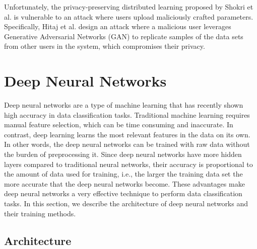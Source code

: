 \documentclass[conference]{IEEEtran}
\begin{document}
Unfortunately, the privacy-preserving distributed learning proposed by Shokri et al. \cite{shokri2015privacy} is vulnerable to an
attack where users upload maliciously crafted parameters. Specifically, Hitaj  et al. \cite{hitaj2017deep} design
an attack where a malicious user 
leverages Generative Adversarial Networks (GAN) to replicate samples of the data sets from other users in the system, which compromises
their privacy. 


\section{Deep Neural Networks}
Deep neural networks are a type of machine learning that has recently shown high accuracy in data classification tasks. Traditional
machine learning requires manual feature selection, which can be time consuming and inaccurate. In contrast, deep learning
learns the most relevant features in the data on its own. In other words, the deep neural networks can be trained with raw data without
the burden of preprocessing it. Since deep neural networks have more hidden layers compared to traditional neural networks, their
accuracy is proportional to the amount of data used for training, i.e., the larger the training data set the more accurate that the
deep neural networks become. These advantages make deep neural networks a very effective technique to perform data classification
tasks. In this section, we describe the architecture of deep neural networks and their training methods. 


\subsection{Architecture}\label{sec:MLP}
\end{document}
